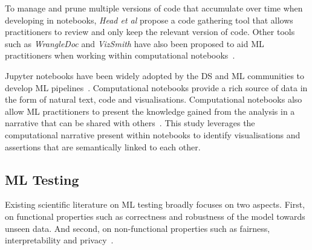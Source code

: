 To manage and prune multiple versions of code that accumulate over time when developing in notebooks, \emph{Head et al} propose a code gathering tool that allows practitioners to review and only keep the relevant version of code. Other tools such as \textit{WrangleDoc} and \textit{VizSmith} have also been proposed to aid ML practitioners when working within computational notebooks~\cite{yang2021subtle, bavishi2021vizsmith}.

Jupyter notebooks have been widely adopted by the DS and ML communities to develop ML pipelines~\cite{wang2020assessing,pimentel2019large,quaranta2021kgtorrent}. Computational notebooks provide a rich source of data in the form of natural text, code and visualisations. Computational notebooks also allow ML practitioners to present the knowledge gained from the analysis in a narrative that can be shared with others~\cite{rule2018exploration}. This study leverages the computational narrative present within notebooks to identify visualisations and assertions that are semantically linked to each other.

\subsection{ML Testing}\label{sec:ml-testing}


Existing scientific literature on ML testing broadly focuses on two aspects. First, on functional properties such as correctness and robustness of the model towards unseen data. And second, on non-functional properties such as fairness, interpretability and privacy~\cite{zhang2020machine,mehrabi2021survey,chen2022fairness}.

